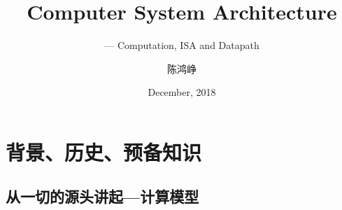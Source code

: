 \documentclass{myslide}
\title{Computer System Architecture}
\subtitle{--- Computation, ISA and Datapath}
\author[chhzh123]{陈鸿峥}
\date[Dec 30, 2018]{December, 2018}
\begin{document}
\begin{frame}
\titlepage
\end{frame}

\begin{frame}
\tableofcontents[hideallsubsections]
\end{frame}

\section{背景、历史、预备知识}
\begin{frame}
\sectionpage
\end{frame}

\subsection{从一切的源头讲起---计算模型}
\begin{frame}
\subsectionpage
\end{frame}
\end{document}
